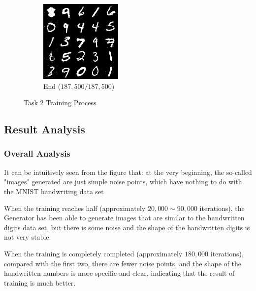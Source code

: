 \documentclass{article}
\begin{document}
\begin{figure}[!htbp]
\begin{subfigure}[b]{0.3\textwidth}
    \includegraphics[width=\textwidth]{img/p2t2/187500.png}
    \caption{End ($187,500/187,500$)}
  \end{subfigure}
  \caption{Task 2 Training Process}
  \label{fig:p2t2_train}
\end{figure}

\subsection{Result Analysis}

\subsubsection{Overall Analysis}

It can be intuitively seen from the figure that: at the very beginning, the so-called "images" generated are just simple noise points, which have nothing to do with the MNIST handwriting data set

When the training reaches half (approximately $20,000 \sim 90,000$ iterations), the Generator has been able to generate images that are similar to the handwritten digits data set, but there is some noise and the shape of the handwritten digits is not very stable.

When the training is completely completed (approximately $180,000$ iterations), compared with the first two, there are fewer noise points, and the shape of the handwritten numbers is more specific and clear, indicating that the result of training is much better.
\end{document}
